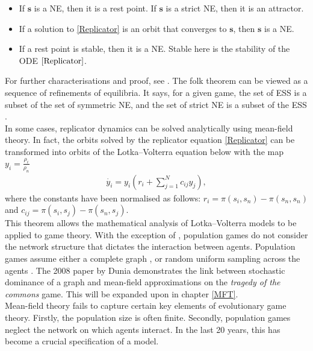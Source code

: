 \begin{itemize}
    \item If $\mathbf{s}$ is a NE, then it is a rest point. If $\mathbf{s}$ is a strict NE, then it is an attractor. 
    \item If a solution to \eqref{Replicator} is an orbit that converges to $\mathbf{s}$, then $\mathbf{s}$ is a NE. 
    \item If a rest point is stable, then it is a NE. Stable here is the stability of the ODE $\eqref{Replicator}$. 
\end{itemize}
For further characterisations and proof, see \cite{RN99, RN81}. The folk theorem can be viewed as a sequence of refinements of equilibria. It says,  for a given game, the set of ESS is a subset of the set of symmetric NE, and the set of strict NE is a subset of the ESS \cite{RN91}.  \\


In some cases, replicator dynamics can be solved analytically using mean-field theory. In fact, the orbits solved by the replicator equation \eqref{Replicator} can be transformed into orbits of the Lotka--Volterra equation below with the map $y_i = \frac{\rho_i}{\rho_n}$ \cite{RN81}\\
\begin{align*} \label{LV}
    \dot{y_i} = y_i\left ( r_i + \sum_{j =1}^N c_{ij} y_j \right ),
\end{align*}
where the constants have been normalised as follows: $r_i = \pi(s_i,s_n) - \pi(s_n,s_n)$ and $c_{ij} = \pi(s_i,s_j) - \pi(s_n,s_j)$. \\


This theorem allows the mathematical analysis of Lotka--Volterra models to be applied to game theory. With the exception of \cite{RN75}, population games do not consider the network structure that dictates the interaction between agents. Population games assume either a complete graph \cite{RN67}, or random uniform sampling across the agents \cite{RN47}. The 2008 paper by Dunia \cite{RN75} demonstrates the link between stochastic dominance of a graph and mean-field approximations on the \emph{tragedy of the commons} game. This will be expanded upon in chapter \ref{MFT}. \\

Mean-field theory fails to capture certain key elements of evolutionary game theory. Firstly, the population size is often finite. Secondly, population games neglect the network on which agents interact. In the last 20 years, this has become a crucial specification of a model. \\

